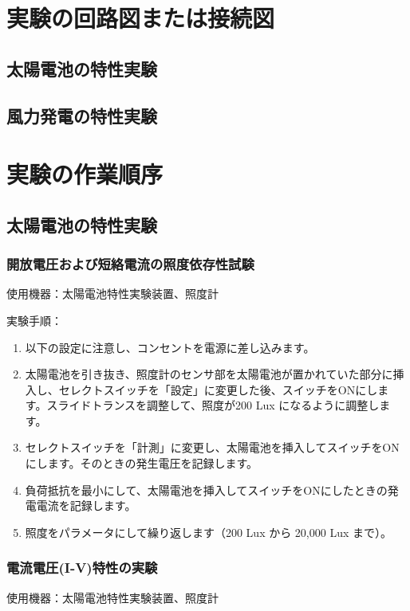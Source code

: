 \documentclass[a4paper,11pt,xelatex,ja=standard]{bxjsarticle}
\begin{document}
\section{実験の回路図または接続図}
    \subsection{太陽電池の特性実験}
    \subsection{風力発電の特性実験}
\section{実験の作業順序}
    \subsection{太陽電池の特性実験}
        \subsubsection{開放電圧および短絡電流の照度依存性試験}
            使用機器：太陽電池特性実験装置、照度計

            実験手順：
            \begin{enumerate}
                \item 以下の設定に注意し、コンセントを電源に差し込みます。
                \item 太陽電池を引き抜き、照度計のセンサ部を太陽電池が置かれていた部分に挿入し、セレクトスイッチを「設定」に変更した後、スイッチをONにします。スライドトランスを調整して、照度が200 Lux になるように調整します。
                \item セレクトスイッチを「計測」に変更し、太陽電池を挿入してスイッチをONにします。そのときの発生電圧を記録します。
                \item 負荷抵抗を最小にして、太陽電池を挿入してスイッチをONにしたときの発電電流を記録します。
                \item 照度をパラメータにして繰り返します（200 Lux から 20,000 Lux まで）。
            \end{enumerate}

        \subsubsection{電流電圧(I-V)特性の実験}
            使用機器：太陽電池特性実験装置、照度計
\end{document}
